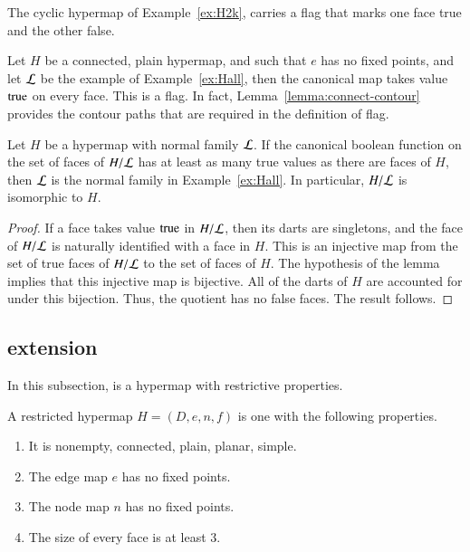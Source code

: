 \begin{example} The cyclic hypermap of Example~\ref{ex:H2k}, carries a flag that marks one face true and the other false.
\end{example}

\begin{example} Let $H$ be a connected, plain hypermap, and such that $e$ has no fixed points, and let $\cal L$ be the example of Example~\ref{ex:Hall}, then the canonical map takes value ${\operatorname{true}}$ on every face.  This is a flag. In fact, Lemma~\ref{lemma:connect-contour} provides the contour paths that are required in the definition of flag.
\end{example}

\begin{lemma}  
Let $H$ be a hypermap with normal family ${\cal L}$. If the canonical boolean function on the set of faces of $H/{\cal L}$ has at least as many true values as there are faces of $H$, then $\cal L$ is the normal family in Example~\ref{ex:Hall}. In particular, $H/{\cal L}$ is isomorphic to $H$.
\end{lemma}

\begin{proof}  If a face takes value ${\operatorname{true}}$ in $H/{\cal L}$, then its darts are singletons, and the face of $H/{\cal L}$ is naturally identified with a face in $H$.  This is an injective map from the set of true faces of $H/{\cal L}$ to the set of faces of $H$.  The hypothesis of the lemma implies that this injective map is bijective. All of the darts of $H$ are accounted for under this bijection. Thus, the quotient has no false faces.  The result follows.
\end{proof}


\subsection{extension}\label{sec:face-insert}

In this subsection,  is a hypermap with restrictive properties.

\begin{definition}[restricted]\label{def:restricted}
A restricted hypermap $H = (D,e,n,f)$ is one with the following properties.
    \begin{enumerate}
        \item It is nonempty, connected, plain, planar, simple.
        \item The edge map $e$ has no fixed points.
        \item The node map $n$ has no fixed points.
        \item The size of every face is at least $3$.
    \end{enumerate}
\end{definition}


